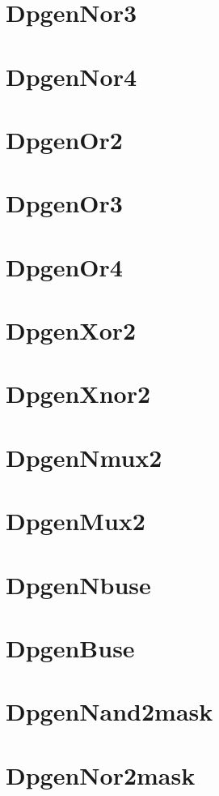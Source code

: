 \documentclass[12pt]{article}
\begin{document}
\section{DpgenNor3} 

\section{DpgenNor4} 

\section{DpgenOr2} 

\section{DpgenOr3} 

\section{DpgenOr4} 

\section{DpgenXor2} 

\section{DpgenXnor2} 

\section{DpgenNmux2}

\section{DpgenMux2}

\section{DpgenNbuse} 

\section{DpgenBuse}

\section{DpgenNand2mask} 

\section{DpgenNor2mask} 

\end{document}
